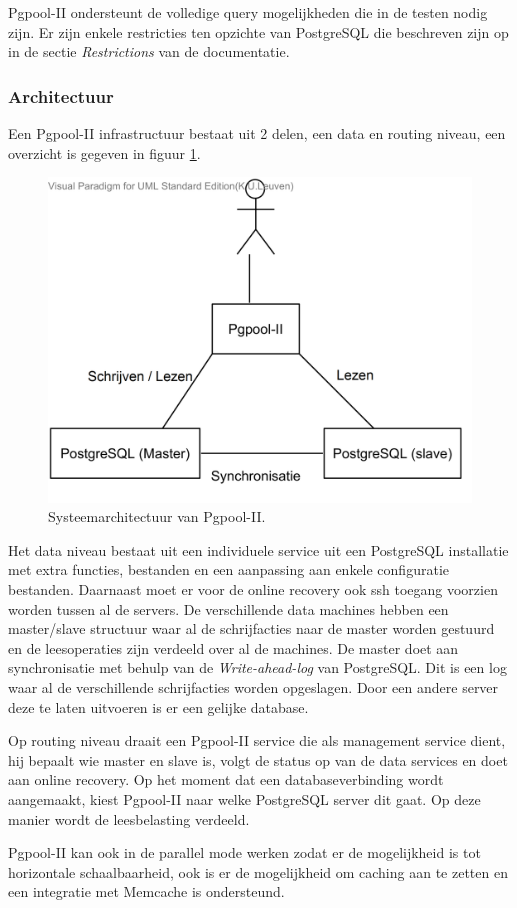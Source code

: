 Pgpool-II ondersteunt de volledige query mogelijkheden die in de testen nodig zijn. Er zijn enkele restricties ten opzichte van PostgreSQL die beschreven zijn op in de sectie \textit{Restrictions} van de documentatie\cite{pgpool-doc}. 

\subsubsection{Architectuur}
Een Pgpool-II infrastructuur bestaat uit 2 delen, een data en routing niveau, een overzicht is gegeven in figuur \ref{fig:Pgpool-structure}. 

\begin{figure}[ht!]
\centering
\includegraphics[width=0.5\linewidth]{img/Pgpool-structuur}
\caption{Systeemarchitectuur van Pgpool-II.}
\label{fig:Pgpool-structure}
\end{figure}

Het data niveau bestaat uit een individuele service uit een PostgreSQL installatie met extra functies, bestanden en een aanpassing aan enkele configuratie bestanden. Daarnaast moet er voor de online recovery ook ssh toegang voorzien worden tussen al de servers. De verschillende data machines hebben een master/slave structuur waar al de schrijfacties naar de master worden gestuurd en de leesoperaties zijn verdeeld over al de machines. De master doet aan synchronisatie met behulp van de \textit{Write-ahead-log} van PostgreSQL. Dit is een log waar al de verschillende schrijfacties worden opgeslagen. Door een andere server deze te laten uitvoeren is er een gelijke database. 

Op routing niveau draait een Pgpool-II service die als management service dient, hij bepaalt wie master en slave is, volgt de status op van de data services en doet aan online recovery. Op het moment dat een databaseverbinding wordt aangemaakt, kiest Pgpool-II naar welke PostgreSQL server dit gaat. Op deze manier wordt de leesbelasting verdeeld. 

Pgpool-II kan ook in de parallel mode werken zodat er de mogelijkheid is tot horizontale schaalbaarheid, ook is er de mogelijkheid om caching aan te zetten en een integratie met Memcache is ondersteund. 

